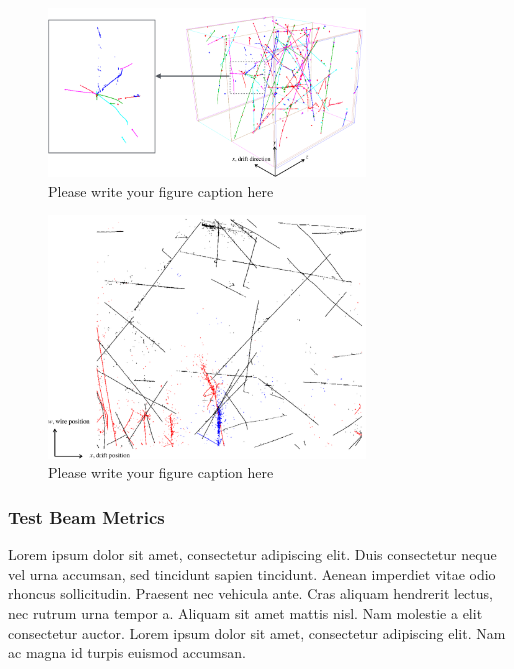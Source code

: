 \begin{figure}
\includegraphics[width=0.75\textwidth]{Figures/EventDisplays/MC/Reconstruction.pdf} 
\caption{Please write your figure caption here}
\label{fig:1a}
\end{figure}

\begin{figure}
\includegraphics[width=0.75\textwidth]{Figures/EventDisplays/MC/EventComposition.pdf} 
\caption{Please write your figure caption here}
\label{fig:1b}
\end{figure}

\subsubsection{Test Beam Metrics}

Lorem ipsum dolor sit amet, consectetur adipiscing elit. Duis consectetur neque vel urna accumsan, sed tincidunt sapien tincidunt. Aenean imperdiet vitae odio rhoncus sollicitudin. Praesent nec vehicula ante. Cras aliquam hendrerit lectus, nec rutrum urna tempor a. Aliquam sit amet mattis nisl. Nam molestie a elit consectetur auctor. Lorem ipsum dolor sit amet, consectetur adipiscing elit. Nam ac magna id turpis euismod accumsan.

